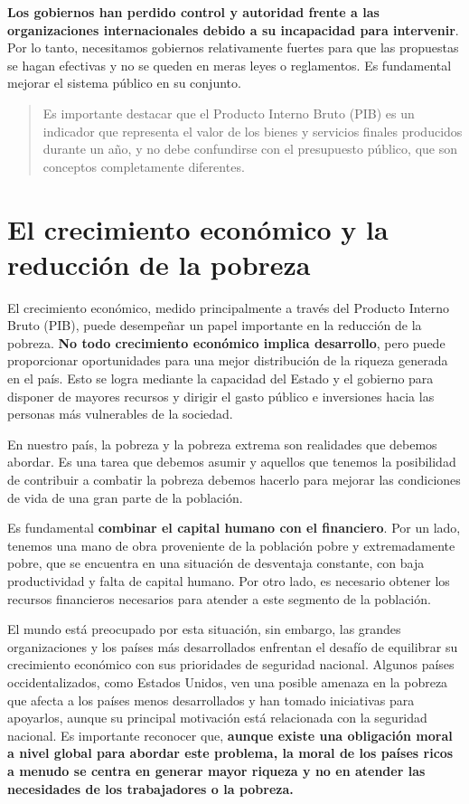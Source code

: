 \documentclass[
  a4paper,
]{article}
\begin{document}
\textbf{Los gobiernos han perdido control y autoridad frente a las
organizaciones internacionales debido a su incapacidad para intervenir}.
Por lo tanto, necesitamos gobiernos relativamente fuertes para que las
propuestas se hagan efectivas y no se queden en meras leyes o
reglamentos. Es fundamental mejorar el sistema público en su conjunto.

\begin{quote}
Es importante destacar que el Producto Interno Bruto (PIB) es un
indicador que representa el valor de los bienes y servicios finales
producidos durante un año, y no debe confundirse con el presupuesto
público, que son conceptos completamente diferentes.
\end{quote}

\section{El crecimiento económico y la reducción de la
pobreza}\label{el-crecimiento-econuxf3mico-y-la-reducciuxf3n-de-la-pobreza}

El crecimiento económico, medido principalmente a través del Producto
Interno Bruto (PIB), puede desempeñar un papel importante en la
reducción de la pobreza. \textbf{No todo crecimiento económico implica
desarrollo}, pero puede proporcionar oportunidades para una mejor
distribución de la riqueza generada en el país. Esto se logra mediante
la capacidad del Estado y el gobierno para disponer de mayores recursos
y dirigir el gasto público e inversiones hacia las personas más
vulnerables de la sociedad.

En nuestro país, la pobreza y la pobreza extrema son realidades que
debemos abordar. Es una tarea que debemos asumir y aquellos que tenemos
la posibilidad de contribuir a combatir la pobreza debemos hacerlo para
mejorar las condiciones de vida de una gran parte de la población.

Es fundamental \textbf{combinar el capital humano con el financiero}.
Por un lado, tenemos una mano de obra proveniente de la población pobre
y extremadamente pobre, que se encuentra en una situación de desventaja
constante, con baja productividad y falta de capital humano. Por otro
lado, es necesario obtener los recursos financieros necesarios para
atender a este segmento de la población.

El mundo está preocupado por esta situación, sin embargo, las grandes
organizaciones y los países más desarrollados enfrentan el desafío de
equilibrar su crecimiento económico con sus prioridades de seguridad
nacional. Algunos países occidentalizados, como Estados Unidos, ven una
posible amenaza en la pobreza que afecta a los países menos
desarrollados y han tomado iniciativas para apoyarlos, aunque su
principal motivación está relacionada con la seguridad nacional. Es
importante reconocer que, \textbf{aunque existe una obligación moral a
nivel global para abordar este problema, la moral de los países ricos a
menudo se centra en generar mayor riqueza y no en atender las
necesidades de los trabajadores o la pobreza.}
\end{document}
